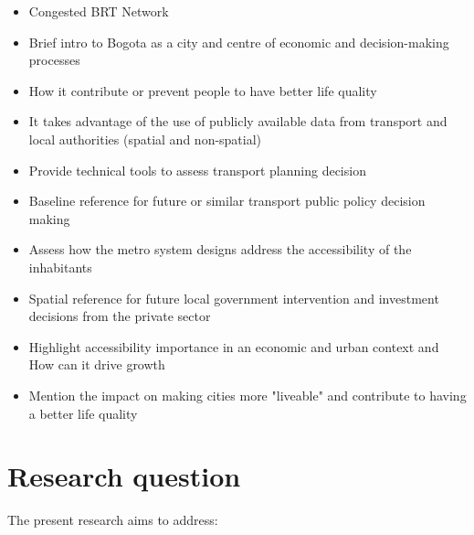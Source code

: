 \documentclass[12pt, a4paper]{report}
\begin{document}
\begin{itemize}

\item Congested BRT Network

\item Brief intro to Bogota as a city and centre of economic and decision-making processes
\item How it contribute or prevent people to have better life quality
\item It takes advantage of the use of publicly available data from transport and local authorities (spatial and non-spatial)
  \item Provide technical tools to assess transport planning decision
  \item Baseline reference for future or similar transport public policy decision making
  \item Assess how the metro system designs address the accessibility of the inhabitants
  \item Spatial reference for future local government intervention and investment decisions from the private sector
  \item Highlight accessibility importance in an economic and urban context and How can it drive growth
  \item Mention the impact on making cities more "liveable" and contribute to having a better life quality
\end{itemize}

\section{Research question}

The present research aims to address:





\end{document}
